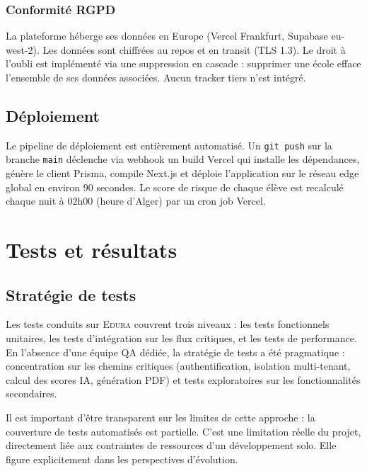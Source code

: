 \documentclass[12pt,a4paper,oneside]{report}
\newcommand{\edura}{\textsc{Edura}}
\begin{document}
\subsection{Conformité RGPD}

La plateforme héberge ses données en Europe (Vercel Frankfurt, Supabase eu-west-2). Les données sont chiffrées au repos et en transit (TLS 1.3). Le droit à l'oubli est implémenté via une suppression en cascade : supprimer une école efface l'ensemble de ses données associées. Aucun tracker tiers n'est intégré.

\section{Déploiement}

Le pipeline de déploiement est entièrement automatisé. Un \texttt{git push} sur la branche \texttt{main} déclenche via webhook un build Vercel qui installe les dépendances, génère le client Prisma, compile Next.js et déploie l'application sur le réseau edge global en environ 90 secondes. Le score de risque de chaque élève est recalculé chaque nuit à 02h00 (heure d'Alger) par un cron job Vercel.

\chapter{Tests et résultats}

\section{Stratégie de tests}

Les tests conduits sur \edura{} couvrent trois niveaux : les tests fonctionnels unitaires, les tests d'intégration sur les flux critiques, et les tests de performance. En l'absence d'une équipe QA dédiée, la stratégie de tests a été pragmatique : concentration sur les chemins critiques (authentification, isolation multi-tenant, calcul des scores IA, génération PDF) et tests exploratoires sur les fonctionnalités secondaires.

Il est important d'être transparent sur les limites de cette approche : la couverture de tests automatisés est partielle. C'est une limitation réelle du projet, directement liée aux contraintes de ressources d'un développement solo. Elle figure explicitement dans les perspectives d'évolution.
\end{document}

